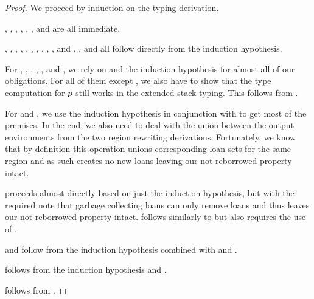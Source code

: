 \begin{proof}
  We proceed by induction on the typing derivation.

  , , , ,
  , , and  are all immediate.

  , , ,
  , , , ,
  , , , and ,
  , and  all follow directly from the
  induction hypothesis.

  For , , ,
  , , and , we
  rely on  and the induction
  hypothesis for almost all of our obligations. For all of them except
  , we also have to show that the type computation for
  $p$ still works in the extended stack typing. This follows from
  .

  For  and , we use the induction hypothesis in
  conjunction with  to get most of
  the premises. In the end, we also need to deal with the union between the
  output environments from the two region rewriting derivations. Fortunately, we
  know that by definition this operation unions corresponding loan sets for the
  same region and as such creates no new loans leaving our not-reborrowed
  property intact.

   proceeds almost directly based on just the induction
  hypothesis, but with the required note that garbage collecting loans can only
  remove loans and thus leaves our not-reborrowed property intact.
   follows similarly to  but also requires the use
  of .

   and  follow from the induction
  hypothesis combined with  and
  .

   follows from the induction hypothesis and
  .

   follows from .
\end{proof}

